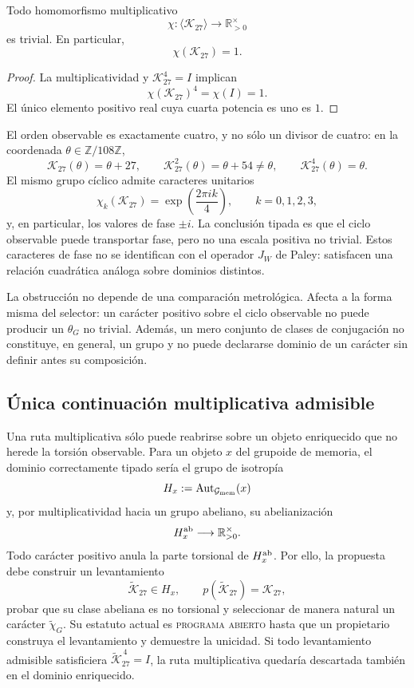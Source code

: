 \begin{theorem}
\label{thm:no-go-chi-G-observable}
Todo homomorfismo multiplicativo
\[
 \chi:\langle\mathcal K_{27}\rangle
 \longrightarrow\mathbb R_{>0}^{\times}
\]
es trivial. En particular,
\[
 \chi(\mathcal K_{27})=1.
\]
\end{theorem}

\begin{proof}
La multiplicatividad y \(\mathcal K_{27}^{4}=I\) implican
\[
 \chi(\mathcal K_{27})^4=\chi(I)=1.
\]
El único elemento positivo real cuya cuarta potencia es uno es \(1\).
\end{proof}

El orden observable es exactamente cuatro, y no sólo un divisor de cuatro:
en la coordenada \(\theta\in\mathbb Z/108\mathbb Z\),
\[
 \mathcal K_{27}(\theta)=\theta+27,
 \qquad
 \mathcal K_{27}^{2}(\theta)=\theta+54\neq\theta,
 \qquad
 \mathcal K_{27}^{4}(\theta)=\theta.
\]
El mismo grupo cíclico admite caracteres unitarios
\[
 \chi_k(\mathcal K_{27})
 =\exp\!\left(\frac{2\pi i k}{4}\right),
 \qquad k=0,1,2,3,
\]
y, en particular, los valores de fase \(\pm i\). La conclusión tipada es
que el ciclo observable puede transportar fase, pero no una escala positiva
no trivial. Estos caracteres de fase no se identifican con el operador
\(J_W\) de Paley: satisfacen una relación cuadrática análoga sobre dominios
distintos.

La obstrucción no depende de una comparación metrológica. Afecta a la forma
misma del selector: un carácter positivo sobre el ciclo observable no puede
producir un \(\theta_G\) no trivial. Además, un mero conjunto de clases de
conjugación no constituye, en general, un grupo y no puede declararse dominio
de un carácter sin definir antes su composición.

\subsection{Única continuación multiplicativa admisible}

Una ruta multiplicativa sólo puede reabrirse sobre un objeto enriquecido que
no herede la torsión observable. Para un objeto \(x\) del grupoide de memoria,
el dominio correctamente tipado sería el grupo de isotropía
\[
 H_x:=\operatorname{Aut}_{\mathcal G_{\rm mem}}(x)
\]
y, por multiplicatividad hacia un grupo abeliano, su abelianización
\[
 H_x^{\rm ab}\longrightarrow\mathbb R_{>0}^{\times}.
\]
Todo carácter positivo anula la parte torsional de \(H_x^{\rm ab}\). Por ello,
la propuesta debe construir un levantamiento
\[
 \widetilde{\mathcal K}_{27}\in H_x,
 \qquad
 p(\widetilde{\mathcal K}_{27})=\mathcal K_{27},
\]
probar que su clase abeliana es no torsional y seleccionar de manera natural
un carácter \(\widetilde\chi_G\). Su estatuto actual es
\textsc{programa abierto} hasta que un propietario construya el levantamiento
y demuestre la unicidad. Si todo levantamiento admisible
satisficiera
\(\widetilde{\mathcal K}_{27}^{\,4}=I\), la ruta multiplicativa quedaría
descartada también en el dominio enriquecido.

